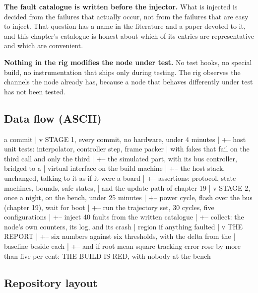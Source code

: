\textbf{The fault catalogue is written before the injector.} What is injected is
decided from the failures that actually occur, not from the failures that are
easy to inject. That question has a name in the literature and a paper devoted
to it, and this chapter's catalogue is honest about which of its entries are
representative and which are convenient.

\textbf{Nothing in the rig modifies the node under test.} No test hooks, no
special build, no instrumentation that ships only during testing. The rig
observes the channels the node already has, because a node that behaves
differently under test has not been tested.

\subsection*{Data flow (ASCII)}

\begin{asciiart}
  a commit
     |
     v
  STAGE 1, every commit, no hardware, under 4 minutes
     |
     +-- host unit tests: interpolator, controller step, frame packer
     |       with fakes that fail on the third call and only the third
     |
     +-- the simulated part, with its bus controller, bridged to a
     |       virtual interface on the build machine
     |
     +-- the host stack, unchanged, talking to it as if it were a board
     |
     +-- assertions: protocol, state machines, bounds, safe states,
     |       and the update path of chapter 19
     |
     v
  STAGE 2, once a night, on the bench, under 25 minutes
     |
     +-- power cycle, flash over the bus (chapter 19), wait for boot
     |
     +-- run the trajectory set, 30 cycles, five configurations
     |
     +-- inject 40 faults from the written catalogue
     |
     +-- collect: the node's own counters, its log, and its crash
     |       region if anything faulted
     |
     v
  THE REPORT
     |
     +-- six numbers against six thresholds, with the delta from the
     |   baseline beside each
     |
     +-- and if root mean square tracking error rose by more than five
         per cent:  THE BUILD IS RED, with nobody at the bench
\end{asciiart}

\subsection*{Repository layout}

